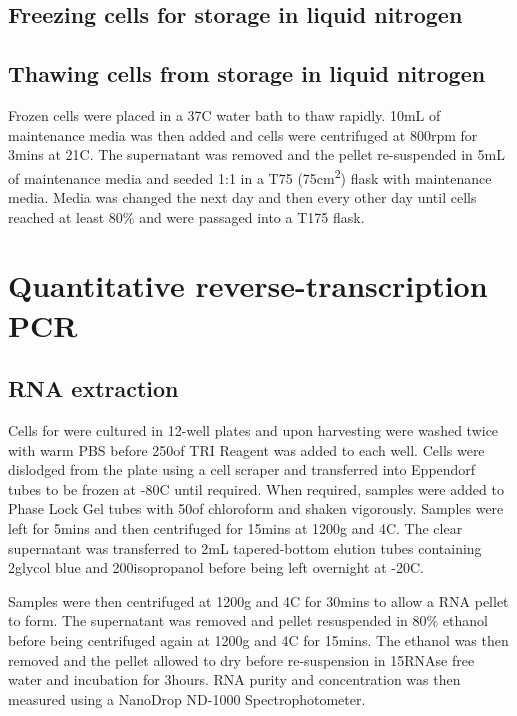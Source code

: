 \subsection{Freezing cells for storage in liquid nitrogen}

\subsection{Thawing cells from storage in liquid nitrogen}

Frozen cells were placed in a 37\textdegree C water bath to thaw rapidly. 10mL of maintenance media was then added and cells were centrifuged at 800rpm for 3mins at 21\textdegree C. The supernatant was removed and the pellet re-suspended in 5mL of maintenance media and seeded 1:1 in a T75 (75cm\textsuperscript{2}) flask with maintenance media. Media was changed the next day and then every other day until cells reached at least 80\% and were passaged into a T175 flask.

\section {Quantitative reverse-transcription PCR}

\subsection{RNA extraction}

Cells for were cultured in 12-well plates and upon harvesting were washed twice with warm PBS before 250\uL of TRI Reagent\textsuperscript{\textregistered}  was added to each well. Cells were dislodged from the plate using a cell scraper and transferred into Eppendorf tubes to be frozen at -80\textdegree C until required. When required, samples were added to Phase Lock Gel tubes with 50\uL of chloroform and shaken vigorously. Samples were left for 5mins and then centrifuged for 15mins at 1200g and 4\textdegree C. The clear supernatant was transferred to 2mL tapered-bottom elution tubes containing 2\uL glycol blue and 200\uL isopropanol before being left overnight at -20\textdegree C. 

Samples were then centrifuged at 1200g and 4\textdegree C for 30mins to allow a RNA pellet to form. The supernatant was removed and pellet resuspended in 80\% ethanol before being centrifuged again at 1200g and 4\textdegree C for 15mins. The ethanol was then removed and the pellet allowed to dry before re-suspension in 15\uL RNAse free water and incubation for 3hours. RNA purity and concentration was then measured using a NanoDrop ND-1000 Spectrophotometer.

